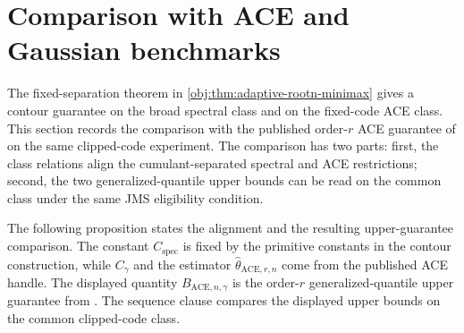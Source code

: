 \section{Comparison with ACE and Gaussian benchmarks}

The fixed-separation theorem in \cref{obj:thm:adaptive-rootn-minimax} gives a contour guarantee on the broad spectral class and on the fixed-code ACE class. This section records the comparison with the published order-\(r\) ACE guarantee of \citet{JinMackeySyrgkanis2025} on the same clipped-code experiment. The comparison has two parts: first, the class relations align the cumulant-separated spectral and ACE restrictions; second, the two generalized-quantile upper bounds can be read on the common class under the same JMS eligibility condition.

The following proposition states the alignment and the resulting upper-guarantee comparison. The constant \(C_{\mathrm{spec}}\) is fixed by the primitive constants in the contour construction, while \(C_{\gamma}\) and the estimator \(\widehat\theta_{\mathrm{ACE},r,n}\) come from the published ACE handle. The displayed quantity \(B_{\mathrm{ACE},n,\gamma}\) is the order-\(r\) generalized-quantile upper guarantee from \citet{JinMackeySyrgkanis2025}. The sequence clause compares the displayed upper bounds on the common clipped-code class.

